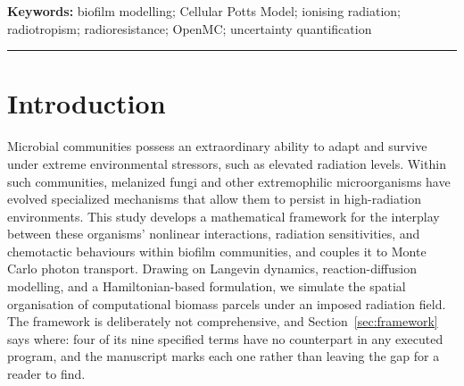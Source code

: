 \documentclass[11pt]{article}
\begin{document}
\begin{abstract}
The boundaries are declared rather than discovered late. A proposed partial stochastic
differential equation organises diffusion, directed motility, nutrient, radiation, melanin,
interaction and forcing terms; it is a specification, and the original simulations---the CPM,
two Langevin programs described once in Methods, and a radial transport solver now in a
companion paper---realise only subsets of it. The original CPM represents seven named species as computational biomass parcels rather
than individual organisms, and has neither biomass growth nor a dose-dependent survival process,
so the implemented phenotype is radiotropism and the model cannot test radiotrophy or
radioresistance. The transport workflow is explicitly non-calibrating: no target physical
parameter is inferred and no value is fitted to this system. The parameters are not uniform in
provenance and are not reported as though they were: most are literature priors or values
derived from them, several are flagged as weakly supported, and the melanin coupling through
which radiation actually reaches the acceptance dynamics is a declared modelling choice ---
hard-coded and uncited, and tabulated as such beside every other value the model runs with.

What the work establishes is a reproducible computational foundation, one ensemble answer
about its own acceptance rule, and a specific list of the measurements, uncertainty controls, and
model revisions required before any physical or biological feedback claim can be evaluated.
\end{abstract}
\noindent\textbf{Keywords:} biofilm modelling; Cellular Potts Model; ionising radiation;
radiotropism; radioresistance; OpenMC; uncertainty quantification
\par
\noindent\rule{\linewidth}{0.5pt}

\section{Introduction}
\label{sec:intro}

Microbial communities possess an extraordinary ability to adapt and survive under extreme
environmental stressors, such as elevated radiation levels. Within such communities, melanized
fungi and other extremophilic microorganisms have evolved specialized mechanisms that allow them
to persist in high-radiation environments. This study develops a mathematical framework for the interplay between
these organisms' nonlinear interactions, radiation sensitivities, and chemotactic behaviours
within biofilm communities, and couples it to Monte Carlo photon transport. Drawing on Langevin
dynamics, reaction-diffusion modelling, and a Hamiltonian-based formulation, we simulate the
spatial organisation of computational biomass parcels under an imposed radiation field. The
framework is deliberately not comprehensive, and Section~\ref{sec:framework} says where: four of
its nine specified terms have no counterpart in any executed program, and the manuscript marks
each one rather than leaving the gap for a reader to find.
\end{document}
